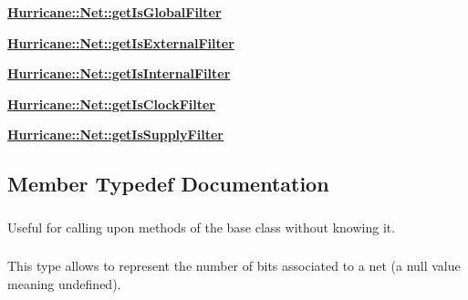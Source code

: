 \begin{DoxyItemize}
\item {\bfseries \hyperlink{classHurricane_1_1Net_a1730ed1247cd9bce7fcf519ea60dc738}{Hurricane\-::\-Net\-::get\-Is\-Global\-Filter}}
\item {\bfseries \hyperlink{classHurricane_1_1Net_a3af91a80e219e37e70229e61dfd385da}{Hurricane\-::\-Net\-::get\-Is\-External\-Filter}}
\item {\bfseries \hyperlink{classHurricane_1_1Net_a7a2d1c4ab84bf81a16e24557d2342ea5}{Hurricane\-::\-Net\-::get\-Is\-Internal\-Filter}}
\item {\bfseries \hyperlink{classHurricane_1_1Net_afdb2269f3a88923c25264f6f785372a1}{Hurricane\-::\-Net\-::get\-Is\-Clock\-Filter}}
\item {\bfseries \hyperlink{classHurricane_1_1Net_ac241f44abf1f332004dd6103ee1dfa48}{Hurricane\-::\-Net\-::get\-Is\-Supply\-Filter}} 
\end{DoxyItemize}

\subsection{Member Typedef Documentation}
\hypertarget{classHurricane_1_1Net_a3f1ac0fcb03638b2ffa9af6a9a58de15}{
\subsubsection[{Inherit}]{}}\label{classHurricane_1_1Net_a3f1ac0fcb03638b2ffa9af6a9a58de15}
Useful for calling upon methods of the base class without knowing it. \hypertarget{classHurricane_1_1Net_a3a242d929e0c733f90f3f69be8cc427b}{
\subsubsection[{Arity}]{}}\label{classHurricane_1_1Net_a3a242d929e0c733f90f3f69be8cc427b}
This type allows to represent the number of bits associated to a net (a null value meaning undefined). 

